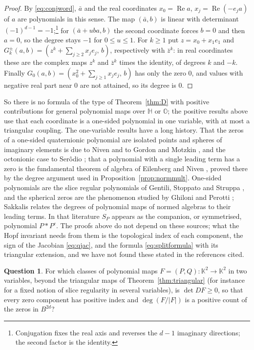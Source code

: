\documentclass[11pt]{amsart}
\numberwithin{equation}{section}
\theoremstyle{plain}
\theoremstyle{definition}
\newtheorem{question}[theorem]{Question}
\theoremstyle{remark}
\newcommand{\Hq}{\mathbb{H}}
\newcommand{\Oc}{\mathbb{O}}
\newcommand{\K}{\mathbb{K}}
\renewcommand{\Re}{\operatorname{Re}}
\begin{document}
\begin{proof}
By \eqref{eq:conjword}, $\bar a$ and the real coordinates $x_0=\Re a$, $x_j=\Re(-e_ja)$ of $a$ are polynomials in this sense. The map $(\bar a,b)$ is linear with determinant $(-1)^{d-1}=-1$;\footnote{Conjugation fixes the real axis and reverses the $d-1$ imaginary directions; the second factor is the identity.} for $(\bar a+uba,b)$ the second coordinate forces $b=0$ and then $a=0$, so the degree stays $-1$ for $0\le u\le1$. For $k\ge1$ put $z=x_0+x_1e_1$ and $G^\pm_k(a,b)=(z^k+\sum_{j\ge2}x_je_j,\,b)$, respectively with $\bar z^k$: in real coordinates these are the complex maps $z^k$ and $\bar z^k$ times the identity, of degrees $k$ and $-k$. Finally $G_0(a,b)=(x_0^2+\sum_{j\ge1}x_je_j,\,b)$ has only the zero $0$, and values with negative real part near $0$ are not attained, so its degree is $0$.
\end{proof}

So there is no formula of the type of Theorem~\ref{thm:D} with positive contributions for general polynomial maps over $\Hq$ or $\Oc$; the positive results above use that each coordinate is a one-sided polynomial in one variable, with at most a triangular coupling. The one-variable results have a long history. That the zeros of a one-sided quaternionic polynomial are isolated points and spheres of imaginary elements is due to Niven \cite{Niv41} and to Gordon and Motzkin \cite{GM65}, and the octonionic case to Ser\^odio \cite{Ser07}; that a polynomial with a single leading term has a zero is the fundamental theorem of algebra of Eilenberg and Niven \cite{EN44}, proved there by the degree argument used in Proposition~\ref{prop:normmult}. One-sided polynomials are the slice regular polynomials of Gentili, Stoppato and Struppa \cite{GSS13}, and the spherical zeros are the phenomenon studied by Ghiloni and Perotti \cite{GP11}; Sakkalis \cite{Sak20} relates the degrees of polynomial maps of normed algebras to their leading terms. In that literature $S_P$ appears as the companion, or symmetrised, polynomial $P*P^c$. The proofs above do not depend on these sources; what the Hopf invariant needs from them is the topological index of each component, the sign of the Jacobian \eqref{eq:qjac}, and the formula \eqref{eq:splitformula} with its triangular extension, and we have not found these stated in the references cited.

\begin{question}\label{q:quaternionic}
For which classes of polynomial maps $F=(P,Q)\colon\K^2\to\K^2$ in two variables, beyond the triangular maps of Theorem~\ref{thm:triangular} (for instance for a fixed notion of slice regularity in several variables), is $\det DF\ge0$, so that every zero component has positive index and $\deg(F/|F|)$ is a positive count of the zeros in $B^{2d}$?
\end{question}
\end{document}
